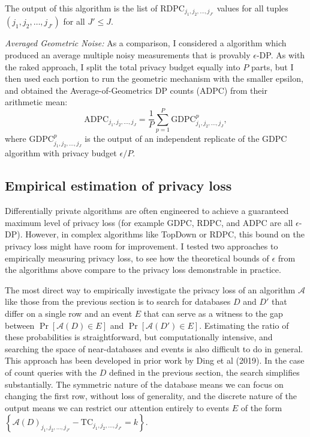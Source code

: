 \documentclass{article}
\begin{document}
The output of this algorithm is the list of $
\mathrm{RDPC}_{j_1, j_2, \ldots, j_{J'}}$ values for all tuples $(j_1, j_2, \ldots, j_{J'})$ for all $J' \leq J$.

\emph{Averaged Geometric Noise:} As a comparison, I considered a algorithm which produced an average multiple noisy measurements that is provably $\epsilon$-DP.  As with the raked approach, I split the total privacy budget equally into $P$ parts, but I then used each portion to run the geometric mechanism with the smaller epsilon, and obtained the Average-of-Geometrics DP counts (ADPC) from their arithmetic mean:
$$
\mathrm{ADPC}_{j_1,j_2,\ldots, j_{J}} =
\frac{1}{P}\sum_{p=1}^P
\mathrm{GDPC}_{j_1, j_2, \ldots, j_{J}}^p,
$$
where $\mathrm{GDPC}_{j_1, j_2, \ldots, j_{J}}^p$ is the output of an independent replicate of the GDPC algorithm with privacy budget $\epsilon/P$.

\subsection{Empirical estimation of privacy loss}
Differentially private algorithms are often engineered to achieve a guaranteed maximum level of privacy loss (for example GDPC, RDPC, and ADPC are all $\epsilon$-DP).  However, in complex algorithms like TopDown or RDPC, this bound on the privacy loss might have room for improvement.  I tested two approaches to empirically measuring privacy loss, to see how the theoretical bounds of $\epsilon$ from the algorithms above compare to the privacy loss demonstrable in practice.

The most direct way to empirically investigate the privacy loss of an algorithm $\mathcal{A}$ like those from the previous section is to search for databases $D$ and $D'$ that differ on a single row and an event $E$ that can serve as a witness to the gap between $\Pr[\mathcal{A}(D) \in E]$ and $\Pr[\mathcal{A}(D') \in E]$.  Estimating the ratio of these probabilities is straightforward, but computationally intensive, and searching the space of near-databases and events is also difficult to do in general.  This approach has been developed in prior work by Ding et al (2019).\cite{ding2018detecting}  In the case of count queries with the $D$ defined in the previous section, the search simplifies substantially.  The symmetric nature of the database means we can focus on changing the first row, without loss of generality, and the discrete nature of the output means we can restrict our attention entirely to events $E$ of the form $\left\{\mathcal{A}(D)_{j_1, j_2, \ldots, j_{J'}}
- \mathrm{TC}_{j_1, j_2, \ldots, j_{J'}}
= k\right\}$.
\end{document}
